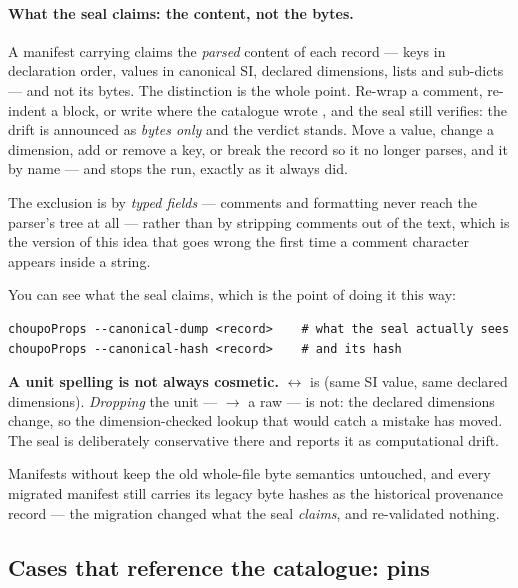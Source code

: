 \documentclass[11pt,a4paper]{article}
\begin{document}
\paragraph{What the seal claims: the content, not the bytes.}
A manifest carrying  claims the
\emph{parsed} content of each record --- keys in declaration order, values
in canonical SI, declared dimensions, lists and sub-dicts --- and not its
bytes.  The distinction is the whole point.  Re-wrap a comment, re-indent a
block, or write  where the catalogue wrote , and
the seal still verifies: the drift is announced as \emph{bytes only} and
the verdict stands.  Move a value, change a dimension, add or remove a key,
or break the record so it no longer parses, and it  by name
--- and  stops the run, exactly as it always
did.

The exclusion is by \emph{typed fields} --- comments and formatting never
reach the parser's tree at all --- rather than by stripping comments out of
the text, which is the version of this idea that goes wrong the first time
a comment character appears inside a string.

You can see what the seal claims, which is the point of doing it this way:

\begin{lstlisting}
choupoProps --canonical-dump <record>    # what the seal actually sees
choupoProps --canonical-hash <record>    # and its hash
\end{lstlisting}

\begin{pitfall}
\textbf{A unit spelling is not always cosmetic.}   $\leftrightarrow$
 is (same SI value, same declared dimensions).  \emph{Dropping}
the unit ---  $\to$ a raw  --- is not: the declared
dimensions change, so the dimension-checked lookup that would catch a
mistake has moved.  The seal is deliberately conservative there and reports
it as computational drift.
\end{pitfall}

Manifests without  keep the old whole-file
byte semantics untouched, and every migrated manifest still carries its
legacy byte hashes as the historical provenance record --- the migration
changed what the seal \emph{claims}, and re-validated nothing.

\subsection{Cases that reference the catalogue: pins}\label{sec:case-pins}
\end{document}

